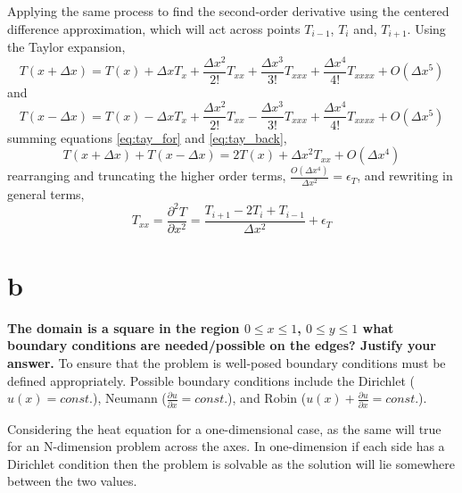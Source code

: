 \documentclass[10pt, a4paper]{article}
\begin{document}
Applying the same process to find the second-order derivative using the centered difference approximation, which will act across points $T_{i-1}$, $T_{i}$ and, $T_{i+1}$. Using the Taylor expansion,
\begin{equation}
T(x + \Delta x) = T(x) + \Delta x T_{x} + \frac{\Delta x^2}{2!} T_{xx} + \frac{\Delta x^3}{3!} T_{xxx} + \frac{\Delta x^4}{4!} T_{xxxx} + O(\Delta x^5)
\label{eq:tay_for}
\end{equation}
and
\begin{equation}
T(x - \Delta x) = T(x) - \Delta x T_{x} + \frac{\Delta x^2}{2!} T_{xx} - \frac{\Delta x^3}{3!} T_{xxx} + \frac{\Delta x^4}{4!} T_{xxxx} + O(\Delta x^5)
\label{eq:tay_back}
\end{equation}
summing equations \ref{eq:tay_for} and \ref{eq:tay_back},
\begin{equation}
T(x + \Delta x) + T(x - \Delta x) = 2T(x) + \Delta x^2 T_{xx} + O(\Delta x^4)
\label{eq:tay_sum}
\end{equation}
rearranging and truncating the higher order terms, $\frac{O(\Delta x^4)}{\Delta x^2} = \epsilon_T$, and rewriting in general terms,
\begin{equation}
T_{xx} = \frac{\partial^2 T}{\partial x^2} = \frac{T_{i+1} - 2T_{i} + T_{i-1}}{\Delta x^2} + \epsilon_T
\label{eq:tay_sum}
\end{equation}

\section*{b}
\textbf{The domain is a square in the region $0 \leq x \leq 1$, $0 \leq y \leq 1$ what boundary conditions are needed/possible on the edges?  Justify your answer.}
\newline
To ensure that the problem is well-posed boundary conditions must be defined appropriately. Possible boundary conditions include the Dirichlet ($u(x) =  const.$), Neumann ($\frac{\partial u}{\partial x} = const.$), and Robin ($u(x) + \frac{\partial u}{\partial x} = const.$).

Considering the heat equation for a one-dimensional case, as the same will true for an N-dimension problem across the axes. In one-dimension if each side has a Dirichlet condition then the problem is solvable as the solution will lie somewhere between the two values.
\end{document}
